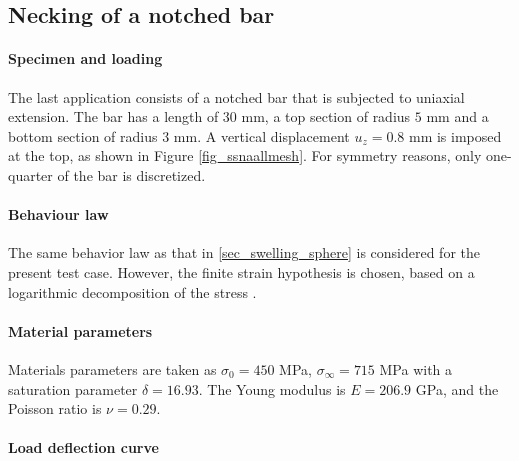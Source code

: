 \subsection{Necking of a notched bar}

\paragraph{Specimen and loading}

The last application consists of a notched bar that is subjected to uniaxial
extension.
The bar has a length of $30$ mm, a top section of radius $5$ mm and a bottom section of radius $3$ mm.
A vertical
displacement $u_z = 0.8$ mm is imposed at the top, as shown in Figure \ref{fig_ssnaallmesh}.
For symmetry reasons, only one-quarter of the
bar is discretized.

\paragraph{Behaviour law}

The same behavior law as that in \ref{sec_swelling_sphere} is considered for the present test case. 
However, the finite strain hypothesis is chosen, based on a logarithmic decomposition of the stress \cite{miehe_anisotropic_2002}.

\paragraph{Material parameters}

Materials parameters are taken as
$\sigma_0 = 450$ MPa, $\sigma_{\infty} = 715$ MPa with a saturation parameter $\delta = 16.93$. The Young modulus is $E = 206.9$ GPa, and the Poisson ratio is $\nu = 0.29$.

\paragraph{Load deflection curve}

